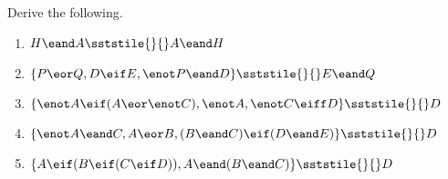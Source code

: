 \noindent\problempart Derive the following.
\begin{enumerate}[label=(\arabic*)]

\item $H \eand A \sststile{}{} A \eand H	$


\item $\{{P \eor Q, D \eif E, \enot P \eand D} \} \sststile{}{} E \eand Q$

%

\item $\{\enot A \eif (A \eor \enot C), \enot A, \enot C \eiff D \} \sststile{}{} D$


\item $\{\enot A \eand C, A \eor B, (B \eand C) \eif (D \eand E) \} \sststile{}{} D$

\item $\{A \eif (B \eif (C \eif D)), A \eand (B \eand C) \} \sststile{}{} D$


\end{enumerate}
